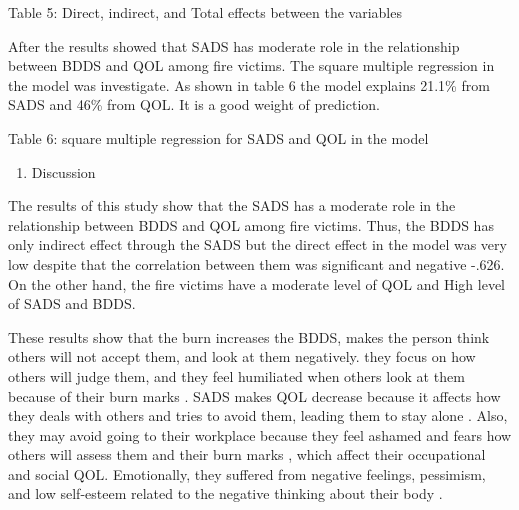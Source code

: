 \documentclass[10pt]{NSP1}
\begin{document}
\begin{table}[htbp]
\centering
{}
\caption{}

\end{table}

Table 5: Direct, indirect, and Total effects between the variables

After the results showed that SADS has moderate role in the relationship between BDDS and QOL among fire victims. The square multiple regression in the model was investigate. As shown in table 6 the model explains 21.1\% from SADS and 46\% from QOL. It is a good weight of prediction.

\begin{table}[htbp]
\centering
{}
\caption{}

\end{table}

Table 6: square multiple regression for SADS and QOL in the model

\begin{enumerate}
  \item Discussion
\end{enumerate}

The results of this study show that the SADS has a moderate role in the relationship between BDDS and QOL among fire victims. Thus, the BDDS has only indirect effect through the SADS but the direct effect in the model was very low despite that the correlation between them was significant and negative -.626. On the other hand, the fire victims have a moderate level of QOL and High level of SADS and BDDS.

These results show that the burn increases the BDDS, makes the person think others will not accept them, and look at them negatively. they focus on how others will judge them, and they feel humiliated when others look at them because of their burn marks . SADS makes QOL decrease because it affects how they deals with others and tries to avoid them, leading them to stay alone . Also, they may avoid going to their workplace because they feel ashamed and fears how others will assess them and their burn marks , which affect their occupational and social QOL. Emotionally, they suffered from negative feelings, pessimism, and low self-esteem related to the negative thinking about their body .
\end{document}
